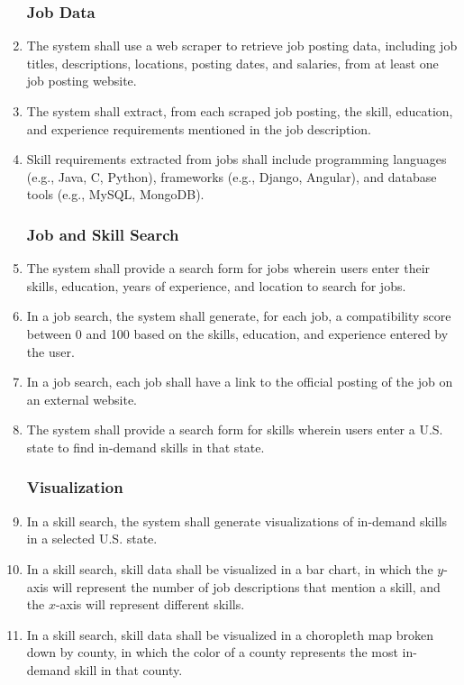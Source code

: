 \documentclass[titlepage]{article}
\def\threedigits#1{%
\ifnum#1<100 0\fi 
\ifnum#1<10 0\fi 
\number#1}
\begin{document}
\begin{enumerate}[label={\textbf{FR\protect\threedigits{\theenumi}}}, leftmargin = *]
\subsubsection{Job Data}
    \item The system shall use a web scraper to retrieve job posting data, including job titles, descriptions, locations, posting dates, and salaries, from at least one job posting website.
    \item The system shall extract, from each scraped job posting, the skill, education, and experience requirements mentioned in the job description.
    \item Skill requirements extracted from jobs shall include programming languages (e.g., Java, C, Python), frameworks (e.g., Django, Angular), and database tools (e.g., MySQL, MongoDB).

\subsubsection{Job and Skill Search}
    \item The system shall provide a search form for jobs wherein users enter their skills, education, years of experience, and location to search for jobs.
    \item In a job search, the system shall generate, for each job, a compatibility score between 0 and 100 based on the skills, education, and experience entered by the user.
    \item In a job search, each job shall have a link to the official posting of the job on an external website.
    \item The system shall provide a search form for skills wherein users enter a U.S. state to find in-demand skills in that state.

\subsubsection{Visualization}
    \item In a skill search, the system shall generate visualizations of in-demand skills in a selected U.S. state.
    \item In a skill search, skill data shall be visualized in a bar chart, in which the $y$-axis will represent the number of job descriptions that mention a skill, and the $x$-axis will represent different skills.
    \item In a skill search, skill data shall be visualized in a choropleth map broken down by county, in which the color of a county represents the most in-demand skill in that county.


\end{enumerate}
\end{document}
